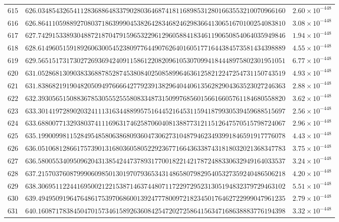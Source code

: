 \documentclass[12pt,reqno]{amsart}
\theoremstyle{remark}
\begin{document}
\begin{longtable}{clc}
$615$ & $626.0348543265411283688648337902803646874181168985312801663553210070966160$ & $2.60\times 10^{-448}$ \\
$616$ & $626.8641105988927080371863999045382642834682462983664130651670100254083810$ & $3.08\times 10^{-448}$ \\
$617$ & $627.7429153389304887218704791596532296129605884183461190650854064035949846$ & $1.94\times 10^{-448}$ \\
$618$ & $628.6149605159189260630054523809776449076264016051771644384573581434398889$ & $4.55\times 10^{-448}$ \\
$619$ & $629.5651517317302726936942409115861220820961053070994184448975802301951051$ & $6.77\times 10^{-448}$ \\
$620$ & $631.0528681309038336887852874538084025085899646361258212247254731150743519$ & $4.93\times 10^{-448}$ \\
$621$ & $631.8386821919048205094976666427792391382964044061356282904363523027246363$ & $2.88\times 10^{-448}$ \\
$622$ & $632.3930565150883678530555255580833487315099768560156616605761184680558820$ & $3.62\times 10^{-448}$ \\
$623$ & $633.3014197289020324111316344889957516445216453115941879930539459688515697$ & $2.56\times 10^{-448}$ \\
$624$ & $633.6880077132938037411169631746258706040813887731211512647570515798724067$ & $2.96\times 10^{-448}$ \\
$625$ & $635.1990099811528495485806386809360473062731048794623493991846591917776078$ & $4.43\times 10^{-448}$ \\
$626$ & $636.0510681286617573901316803605805229236771664363387431818032021368347783$ & $3.75\times 10^{-448}$ \\
$627$ & $636.5800553409509620431385424473789317700182214217872488330632949164033537$ & $3.24\times 10^{-448}$ \\
$628$ & $637.2157037608799906098501301970793653431486580798295405327359240486506218$ & $4.20\times 10^{-448}$ \\
$629$ & $638.3069511224416950021221538714637448071172297295231305194832379729463102$ & $5.51\times 10^{-448}$ \\
$630$ & $639.4949509196476486175397068600139247778009721823450176462722999047961235$ & $2.79\times 10^{-448}$ \\
$631$ & $640.1608717838450470157346158926360842547202725864156347168638883776194398$ & $3.32\times 10^{-448}$ \\

\end{longtable}
\end{document}
